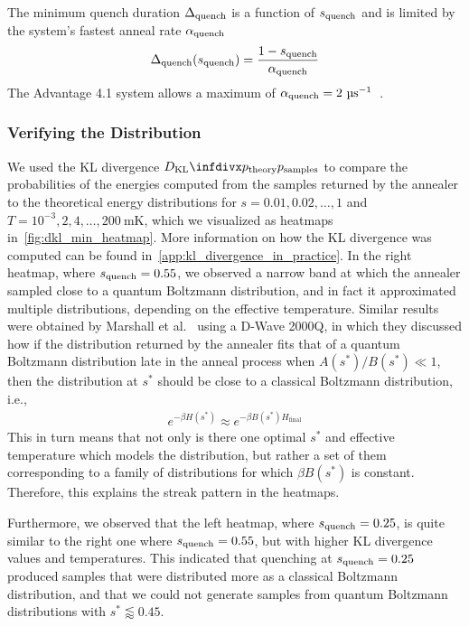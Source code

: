 The minimum quench duration \( \Delta_{\text{quench}} \) is a function of \( s_{\text{quench}} \) and is limited by the system's fastest anneal rate \( \alpha_{\text{quench}} \)
\begin{align}
    \Delta_{\text{quench}}(s_{\text{quench}}) = \frac{1 - s_{\text{quench}}}{\alpha_{\text{quench}}}
\end{align}
The Advantage 4.1 system allows a maximum of \( \alphaquench = 2 \ \si{\micro\second}^{-1} \)~\cite{dwave_solver_parameters}.

\subsubsection{Verifying the Distribution}
We used the KL divergence \( \DKL{\ptheory}{\psamples} \) to compare the probabilities of the energies computed from the samples returned by the annealer to the theoretical energy distributions for \( s = 0.01, 0.02, \dots, 1 \) and \( T = 10^{-3}, 2, 4, \dots, 200 \ \si{\milli\kelvin} \), which we visualized as heatmaps in~\cref{fig:dkl_min_heatmap}.
More information on how the KL divergence was computed can be found in~\cref{app:kl_divergence_in_practice}.
In the right heatmap, where \( s_{\text{quench}} = 0.55 \), we observed a narrow band at which the annealer sampled close to a quantum Boltzmann distribution, and in fact it approximated multiple distributions, depending on the effective temperature.
Similar results were obtained by Marshall et al.~\cite{marshall_2019} using a D-Wave 2000Q, in which they discussed how if the distribution returned by the annealer fits that of a quantum Boltzmann distribution late in the anneal process when \( A(s^*) / B(s^*) \ll 1 \), then the distribution at \( s^* \) should be close to a classical Boltzmann distribution, i.e.,
\begin{align}
    e^{-\beta H(s^*)} \approx e^{-\beta B(s^*) H_\text{final}}
\end{align}
This in turn means that not only is there one optimal \( s^* \) and effective temperature which models the distribution, but rather a set of them corresponding to a family of distributions for which \( \beta B(s^*) \) is constant.
Therefore, this explains the streak pattern in the heatmaps.

Furthermore, we observed that the left heatmap, where \( s_{\text{quench}} = 0.25 \), is quite similar to the right one where \( s_{\text{quench}} = 0.55 \), but with higher KL divergence values and temperatures.
This indicated that quenching at \( s_{\text{quench}} = 0.25 \) produced samples that were distributed more as a classical Boltzmann distribution, and that we could not generate samples from quantum Boltzmann distributions with \( s^* \lessapprox 0.45 \).

